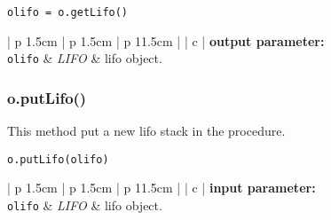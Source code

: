 \begin{verbatim}
olifo = o.getLifo()
\end{verbatim}

\noindent
\begin{tabular} {| p {1.5cm} | p {1.5cm} | p {11.5cm} |}
\hline
{} {| c |} {\bf output parameter:} \\
\hline
{\tt olifo} & {\it LIFO}  & {\sc lifo} object. \\
\hline
\end{tabular}

\vskip 0.8cm

\subsubsection{o.putLifo()}

This method put a new {\sc lifo} stack in the procedure.

\begin{verbatim}
o.putLifo(olifo)
\end{verbatim}

\noindent
\begin{tabular} {| p {1.5cm} | p {1.5cm} | p {11.5cm} |}
\hline
{} {| c |} {\bf input parameter:} \\
\hline
{\tt olifo} & {\it LIFO}  & {\sc lifo} object. \\
\hline
\end{tabular}
